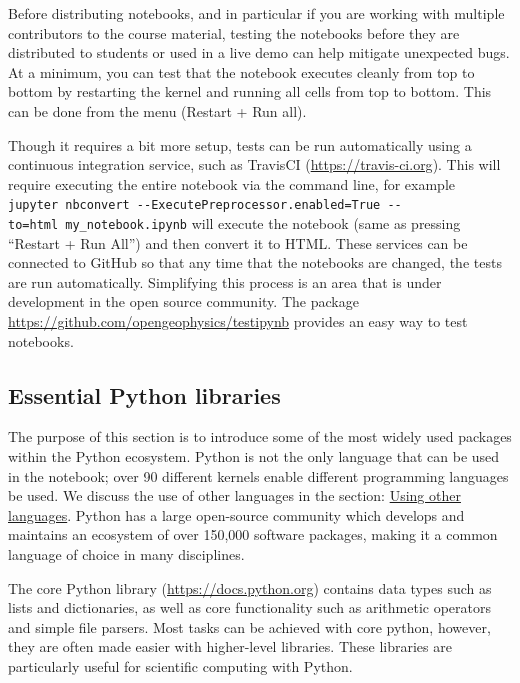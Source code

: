 \documentclass[]{book}
\begin{document}
Before distributing notebooks, and in particular if you are working with
multiple contributors to the course material, testing the notebooks
before they are distributed to students or used in a live demo can help
mitigate unexpected bugs. At a minimum, you can test that the notebook
executes cleanly from top to bottom by restarting the kernel and running
all cells from top to bottom. This can be done from the menu (Restart +
Run all).

Though it requires a bit more setup, tests can be run automatically
using a continuous integration service, such as TravisCI
(\url{https://travis-ci.org}). This will require executing the entire
notebook via the command line, for example
\texttt{jupyter\ nbconvert\ -\/-ExecutePreprocessor.enabled=True\ -\/-to=html\ my\_notebook.ipynb}
will execute the notebook (same as pressing ``Restart + Run All'') and
then convert it to HTML. These services can be connected to GitHub so
that any time that the notebooks are changed, the tests are run
automatically. Simplifying this process is an area that is under
development in the open source community. The package
\url{https://github.com/opengeophysics/testipynb} provides an easy way
to test notebooks.

\subsection{Essential Python
libraries}\label{essential-python-libraries}

The purpose of this section is to introduce some of the most widely used
packages within the Python ecosystem. Python is not the only language
that can be used in the notebook; over 90 different kernels enable
different programming languages be used. We discuss the use of other
languages in the section:
\protect\hyperlink{using-other-languages}{Using other languages}. Python
has a large open-source community which develops and maintains an
ecosystem of over 150,000 software packages, making it a common language
of choice in many disciplines.

The core Python library
(\href{https://docs.python.org/3/}{https://docs.python.org}) contains
data types such as lists and dictionaries, as well as core functionality
such as arithmetic operators and simple file parsers. Most tasks can be
achieved with core python, however, they are often made easier with
higher-level libraries. These libraries are particularly useful for
scientific computing with Python.
\end{document}
